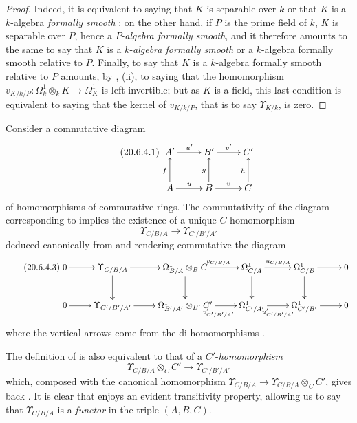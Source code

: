 \begin{proof}
Indeed, it is equivalent to saying that $K$ is separable over $k$ or that $K$ is a $k$-algebra \emph{formally smooth} ; on the other hand, if $P$ is the prime field of $k$, $K$ is separable over $P$, hence a $P$-\emph{algebra formally smooth}, and it therefore amounts to the same to say that $K$ is a $k$-\emph{algebra formally smooth} or a $k$-algebra formally smooth relative to $P$.
Finally, to say that $K$ is a $k$-algebra formally smooth relative to $P$ amounts, by , (ii), to saying that the homomorphism $v_{K/k/P}:\Omega^1_k\otimes_k K\to\Omega^1_K$ is left-invertible; but as $K$ is a field, this last condition is equivalent to saying that the kernel of $v_{K/k/P}$, that is to say $\Upsilon_{K/k}$, is zero.
\end{proof}

\begin{env}[20.6.4]
\label{0.20.6.4}
Consider a commutative diagram
\begin{equation}
\tag{20.6.4.1}
  \label{0.20.6.4.1}
\xymatrix{
  A' \ar[r]^{u'} & B' \ar[r]^{v'} & C' \\
  A \ar[u]^{f} \ar[r]^{u} & B \ar[u]^{g} \ar[r]^{v} & C \ar[u]^{h}
}
\end{equation}
of homomorphisms of commutative rings. The commutativity of the diagram corresponding to  implies the existence of a unique $C$-homomorphism
\begin{equation}
\tag{20.6.4.2}
  \label{0.20.6.4.2}
  \Upsilon_{C/B/A}\to\Upsilon_{C'/B'/A'}
\end{equation}
deduced canonically from  and rendering commutative the diagram
\begin{equation}
\tag{20.6.4.3}
  \label{0.20.6.4.3}
\xymatrix{
  0 \ar[r] & \Upsilon_{C/B/A} \ar[r] \ar[d] & \Omega^1_{B/A}\otimes_B C \ar[r]^{v_{C/B/A}} \ar[d] & \Omega^1_{C/A} \ar[r]^{u_{C/B/A}} \ar[d] & \Omega^1_{C/B} \ar[r] \ar[d] & 0 \\
  0 \ar[r] & \Upsilon_{C'/B'/A'} \ar[r] & \Omega^1_{B'/A'}\otimes_{B'} C' \ar[r]_{v'_{C'/B'/A'}} & \Omega^1_{C'/A'} \ar[r]_{u'_{C'/B'/A'}} & \Omega^1_{C'/B'} \ar[r] & 0
}
\end{equation}
where the vertical arrows come from the di-homomorphisms .

The definition of  is also equivalent to that of a $C'$-\emph{homomorphism}
\begin{equation}
\tag{20.6.4.4}
  \label{0.20.6.4.4}
  \Upsilon_{C/B/A}\otimes_C C'\to\Upsilon_{C'/B'/A'}
\end{equation}
which, composed with the canonical homomorphism $\Upsilon_{C/B/A}\to\Upsilon_{C/B/A}\otimes_C C'$, gives back .
It is clear that  enjoys an evident transitivity property, allowing us to say that $\Upsilon_{C/B/A}$ is a \emph{functor} in the triple $(A,B,C)$.
\end{env}

